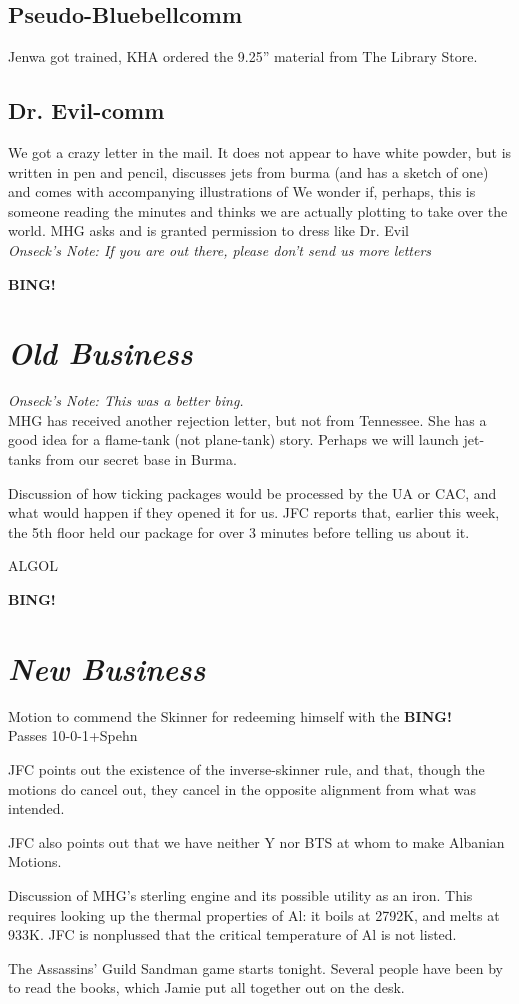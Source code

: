 \documentclass[10pt]{article}
\newcommand{\bing}{{\bf BING!} }
\newcommand{\goto}[1]{\bing \vskip 12pt \section*{{\em{#1}}}}
\begin{document}
\subsection*{Pseudo-Bluebellcomm}
Jenwa got trained, KHA ordered the 9.25'' material from The Library
Store.

\subsection*{Dr. Evil-comm}
We got a crazy letter in the mail. It does not appear to have white
powder, but is written in pen and pencil, discusses jets from burma
(and has a sketch of one) and comes with accompanying illustrations of 
We wonder if, perhaps, this is someone reading the minutes and thinks
we are actually plotting to take over the world. MHG asks and is
granted permission to dress like Dr. Evil\\
\emph{Onseck's Note: If you are out there, please don't send us more letters}

\goto{Old Business}
\emph{Onseck's Note: This was a better bing.}\\

MHG has received another rejection letter, but not from Tennessee. She
has a good idea for a flame-tank (not plane-tank) story. Perhaps we
will launch jet-tanks from our secret base in Burma.

Discussion of how ticking packages would be processed by the UA or
CAC, and what would happen if they opened it for us.
JFC reports that, earlier this week, the 5th floor held our package
for over 3 minutes before telling us about it.

ALGOL

\goto{New Business}
Motion to commend the Skinner for redeeming himself with the \bing \\
Passes 10-0-1+Spehn

JFC points out the existence of the inverse-skinner rule, and that,
though the motions do cancel out, they cancel in the opposite
alignment from what was intended.

JFC also points out that we have neither Y nor BTS at whom to make
Albanian Motions.

Discussion of MHG's sterling engine and its possible utility as an
iron.  This requires looking up the thermal properties of Al: it boils
at 2792K, and melts at 933K.  JFC is nonplussed that the critical
temperature of Al is not listed.

The Assassins' Guild Sandman game starts tonight. Several people have
been by to read the books, which Jamie put all together out on the desk.
\end{document}
